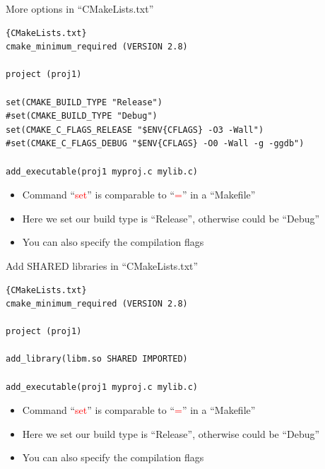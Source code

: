 \begin{frame}[fragile]{More options in  ``CMakeLists.txt''}
\begin{lstlisting}[linewidth=0.95\linewidth, firstnumber= 1, xleftmargin=0.02\linewidth]{CMakeLists.txt}
cmake_minimum_required (VERSION 2.8)

project (proj1)

set(CMAKE_BUILD_TYPE "Release")
#set(CMAKE_BUILD_TYPE "Debug")
set(CMAKE_C_FLAGS_RELEASE "$ENV{CFLAGS} -O3 -Wall")
#set(CMAKE_C_FLAGS_DEBUG "$ENV{CFLAGS} -O0 -Wall -g -ggdb")

add_executable(proj1 myproj.c mylib.c)
\end{lstlisting}

\begin{itemize}
	\item {Command ``\textcolor{red}{set}'' is comparable to ``\textcolor{red}{=}'' in a ``Makefile''}
	\item {Here we set our build type is ``Release'', otherwise could be ``Debug''}
	\item {You can also specify the compilation flags}
\end{itemize}
\end{frame}


\begin{frame}[fragile]{Add SHARED libraries in  ``CMakeLists.txt''}
\begin{lstlisting}[linewidth=0.95\linewidth, firstnumber= 1, xleftmargin=0.02\linewidth]{CMakeLists.txt}
cmake_minimum_required (VERSION 2.8)

project (proj1)

add_library(libm.so SHARED IMPORTED) 

add_executable(proj1 myproj.c mylib.c)

\end{lstlisting}

\begin{itemize}
	\item {Command ``\textcolor{red}{set}'' is comparable to ``\textcolor{red}{=}'' in a ``Makefile''}
	\item {Here we set our build type is ``Release'', otherwise could be ``Debug''}
	\item {You can also specify the compilation flags}
\end{itemize}
\end{frame}

